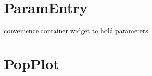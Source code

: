 \documentclass[letterpaper,10pt,english]{sphinxmanual}
\begin{document}
\section{ParamEntry}
\label{ParamEntry:paramentry}\label{ParamEntry::doc}

\begin{fulllineitems}
\label{ParamEntry:Visualplotterwidget.ParamEntry}
convenience container widget to hold parameters

\end{fulllineitems}



\section{PopPlot}
\label{PopPlot:popplot}\label{PopPlot::doc}
\end{document}
